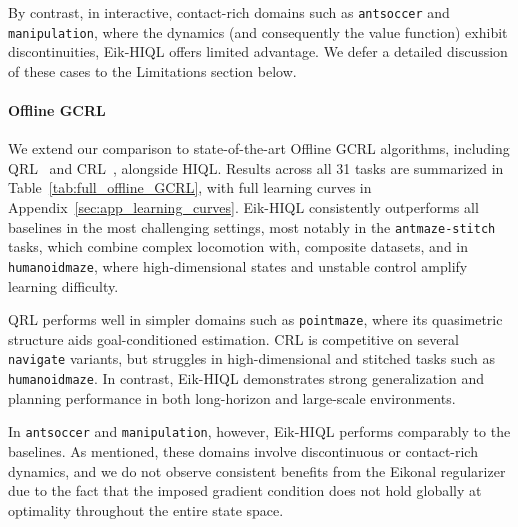 \documentclass{article}
\theoremstyle{plain}
\theoremstyle{definition}
\theoremstyle{remark}
\begin{document}
By contrast, in interactive, contact-rich domains such as \texttt{antsoccer} and \texttt{manipulation}, where the dynamics (and consequently the value function) exhibit discontinuities, Eik-HIQL offers limited advantage. We defer a detailed discussion of these cases to the Limitations section below.

\vspace{-0.0cm}
\paragraph{Offline GCRL} 
We extend our comparison to state-of-the-art Offline GCRL algorithms, including QRL~\cite{wang2023optimal} and CRL~\cite{eysenbach2022contrastive}, alongside HIQL. Results across all 31 tasks are summarized in Table~\ref{tab:full_offline_GCRL}, with full learning curves in Appendix~\ref{sec:app_learning_curves}. Eik-HIQL consistently outperforms all baselines in the most challenging settings, most notably in the \texttt{antmaze-stitch} tasks, which combine complex locomotion with, composite datasets, and in \texttt{humanoidmaze}, where high-dimensional states and unstable control amplify learning difficulty.

QRL performs well in simpler domains such as \texttt{pointmaze}, where its quasimetric structure aids goal-conditioned estimation. CRL is competitive on several \texttt{navigate} variants, but struggles in high-dimensional and stitched tasks such as \texttt{humanoidmaze}. In contrast, Eik-HIQL demonstrates strong generalization and planning performance in both long-horizon and large-scale environments.

In \texttt{antsoccer} and \texttt{manipulation}, however, Eik-HIQL performs comparably to the baselines. As mentioned, these domains involve discontinuous or contact-rich dynamics, and we do not observe consistent benefits from the Eikonal regularizer due to the fact that the imposed gradient condition does not hold globally at optimality throughout the entire state space. 
\end{document}
